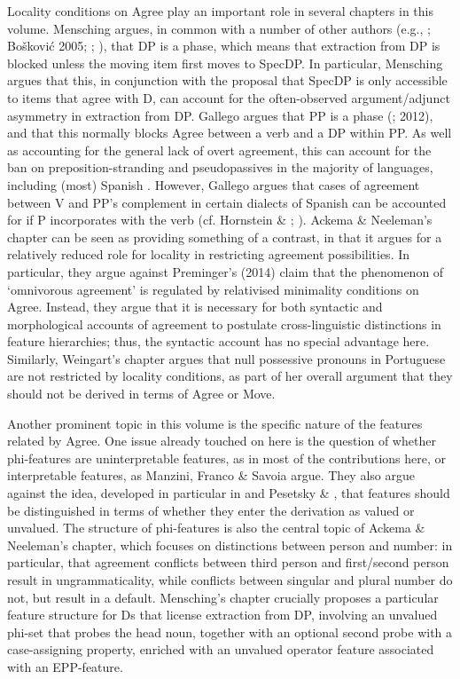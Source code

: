 \documentclass[output=paper]{langsci/langscibook}
\begin{document}
Locality conditions on Agree play an important role in several chapters in this volume. Mensching argues, in common with a number of other authors (e.g., \citealt{Svenonius2004}; Bošković 2005; \citealt{Heck2009}; \citealt{Reeve2018}), that DP is a phase, which means that extraction from DP is blocked unless the moving item first moves to SpecDP. In particular, Mensching argues that this, in conjunction with the proposal that SpecDP is only accessible to items that agree with D, can account for the often-observed argument/adjunct asymmetry in extraction from DP. Gallego argues that PP is a phase (\citealt{Abels2003}; 2012), and that this normally blocks Agree between a verb and a DP within PP. As well as accounting for the general lack of overt agreement, this can account for the ban on preposition-stranding and pseudopassives in the majority of languages, including (most) Spanish \citep{Law2006}. However, Gallego argues that cases of agreement between V and PP’s complement in certain dialects of Spanish can be accounted for if P incorporates with the verb (cf. Hornstein \& \citealt{Weinberg1981}; \citealt{Law2006}). Ackema \& Neeleman’s chapter can be seen as providing something of a contrast, in that it argues for a relatively reduced role for locality in restricting agreement possibilities. In particular, they argue against Preminger’s (2014) claim that the phenomenon of ‘omnivorous agreement’ is regulated by relativised minimality conditions on Agree. Instead, they argue that it is necessary for both syntactic and morphological accounts of agreement to postulate cross-linguistic distinctions in feature hierarchies; thus, the syntactic account has no special advantage here. Similarly, Weingart’s chapter argues that null possessive pronouns in Portuguese are not restricted by locality conditions, as part of her overall argument that they should not be derived in terms of Agree or Move.

Another prominent topic in this volume is the specific nature of the features related by Agree. One issue already touched on here is the question of whether phi-features are uninterpretable features, as in most of the contributions here, or interpretable features, as Manzini, Franco \& Savoia argue. They also argue against the idea, developed in particular in \citet{Chomsky2000} and Pesetsky \& \citet{Torrego2007}, that features should be distinguished in terms of whether they enter the derivation as valued or unvalued. The structure of phi-features is also the central topic of Ackema \& Neeleman’s chapter, which focuses on distinctions between person and number: in particular, that agreement conflicts between third person and first/second person result in ungrammaticality, while conflicts between singular and plural number do not, but result in a default. Mensching’s chapter crucially proposes a particular feature structure for Ds that license extraction from DP, involving an unvalued phi-set that probes the head noun, together with an optional second probe with a case-assigning property, enriched with an unvalued operator feature associated with an EPP-feature.
\end{document}
